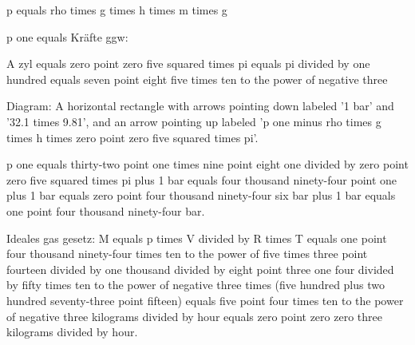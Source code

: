 p equals rho times g times h times m times g

p one equals Kräfte ggw:

A zyl equals zero point zero five squared times pi
equals pi divided by one hundred
equals seven point eight five times ten to the power of negative three

Diagram: A horizontal rectangle with arrows pointing down labeled '1 bar' and '32.1 times 9.81', and an arrow pointing up labeled 'p one minus rho times g times h times zero point zero five squared times pi'.

p one equals thirty-two point one times nine point eight one divided by zero point zero five squared times pi plus 1 bar equals four thousand ninety-four point one plus 1 bar equals zero point four thousand ninety-four six bar plus 1 bar equals one point four thousand ninety-four bar.

Ideales gas gesetz:
M equals p times V divided by R times T equals one point four thousand ninety-four times ten to the power of five times three point fourteen divided by one thousand divided by eight point three one four divided by fifty times ten to the power of negative three times (five hundred plus two hundred seventy-three point fifteen) equals five point four times ten to the power of negative three kilograms divided by hour equals zero point zero zero three kilograms divided by hour.